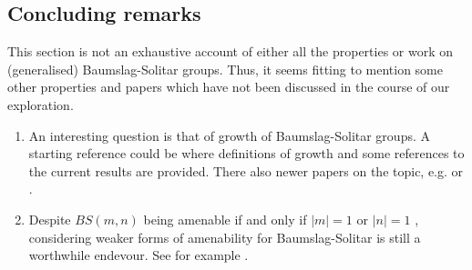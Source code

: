 \subsection{Concluding remarks}
This section is not an exhaustive account of either all the properties or work on (generalised) Baumslag-Solitar groups. Thus, it seems fitting to mention some other properties and papers which have not been discussed in the course of our exploration.
\begin{enumerate}
    \item An interesting question is that of growth of Baumslag-Solitar groups. A starting reference could be \cite{Ha00} where definitions of growth and some references to the current results are provided. There also newer papers on the topic, e.g. \cite{SaSh18} or \cite{FrKnSch11}.
    \item Despite $BS(m,n)$ being amenable if and only if $|m| = 1$ or $|n| = 1$ \cite{CaGaMaSt24}, considering weaker forms of amenability for Baumslag-Solitar is still a worthwhile endevour. See for example \cite{CoVa15}.
\end{enumerate}




